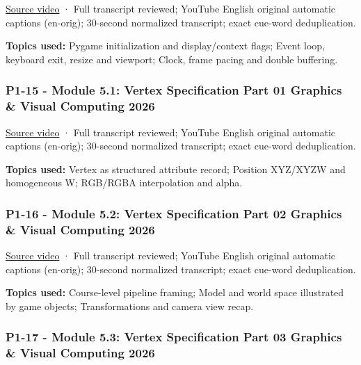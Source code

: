 \href{https://www.youtube.com/watch?v=EtgZoNuFZiw}{Source video} · Full transcript reviewed; YouTube English original automatic captions (en-orig); 30-second normalized transcript; exact cue-word deduplication.

\textbf{Topics used:} Pygame initialization and display/context flags; Event loop, keyboard exit, resize and viewport; Clock, frame pacing and double buffering.

\subsubsection{P1-15 - Module 5.1: Vertex Specification Part 01 Graphics \& Visual Computing 2026}\label{04-visual-computing-ii-ch036-p1-15---module-5.1-vertex-specification-part-01-graphics-visual-computing-2026}

\hypertarget{04-visual-computing-ii-ch036-p1-15---module-5.1-vertex-specification-part-01-graphics-visual-computing-2026}{}

\href{https://www.youtube.com/watch?v=llQ74GoG1po}{Source video} · Full transcript reviewed; YouTube English original automatic captions (en-orig); 30-second normalized transcript; exact cue-word deduplication.

\textbf{Topics used:} Vertex as structured attribute record; Position XYZ/XYZW and homogeneous W; RGB/RGBA interpolation and alpha.

\subsubsection{P1-16 - Module 5.2: Vertex Specification Part 02 Graphics \& Visual Computing 2026}\label{04-visual-computing-ii-ch036-p1-16---module-5.2-vertex-specification-part-02-graphics-visual-computing-2026}

\hypertarget{04-visual-computing-ii-ch036-p1-16---module-5.2-vertex-specification-part-02-graphics-visual-computing-2026}{}

\href{https://www.youtube.com/watch?v=wl-w5PZfmII}{Source video} · Full transcript reviewed; YouTube English original automatic captions (en-orig); 30-second normalized transcript; exact cue-word deduplication.

\textbf{Topics used:} Course-level pipeline framing; Model and world space illustrated by game objects; Transformations and camera view recap.

\subsubsection{P1-17 - Module 5.3: Vertex Specification Part 03 Graphics \& Visual Computing 2026}\label{04-visual-computing-ii-ch036-p1-17---module-5.3-vertex-specification-part-03-graphics-visual-computing-2026}

